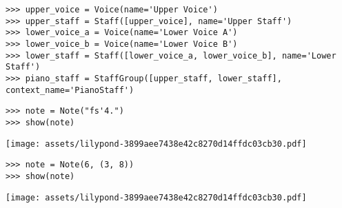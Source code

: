 \begin{abjadbookoutput}
\begin{singlespacing}
\vspace{-0.5\baselineskip}
\begin{lstlisting}
>>> upper_voice = Voice(name='Upper Voice')
>>> upper_staff = Staff([upper_voice], name='Upper Staff')
>>> lower_voice_a = Voice(name='Lower Voice A')
>>> lower_voice_b = Voice(name='Lower Voice B')
>>> lower_staff = Staff([lower_voice_a, lower_voice_b], name='Lower Staff')
>>> piano_staff = StaffGroup([upper_staff, lower_staff], context_name='PianoStaff')
\end{lstlisting}
\end{singlespacing}
\end{abjadbookoutput}

\begin{comment}
<abjad>
note = Note("fs'4.")
show(note)
</abjad>
\end{comment}

\begin{abjadbookoutput}
\begin{singlespacing}
\vspace{-0.5\baselineskip}
\begin{lstlisting}
>>> note = Note("fs'4.")
>>> show(note)
\end{lstlisting}
\noindent\texttt{[image: assets/lilypond-3899aee7438e42c8270d14ffdc03cb30.pdf]}
\end{singlespacing}
\end{abjadbookoutput}

\begin{comment}
<abjad>
note = Note(6, (3, 8))
show(note)
</abjad>
\end{comment}

\begin{abjadbookoutput}
\begin{singlespacing}
\vspace{-0.5\baselineskip}
\begin{lstlisting}
>>> note = Note(6, (3, 8))
>>> show(note)
\end{lstlisting}
\noindent\texttt{[image: assets/lilypond-3899aee7438e42c8270d14ffdc03cb30.pdf]}
\end{singlespacing}
\end{abjadbookoutput}

\begin{comment}
<abjad>
chord = Chord("<c'' ef'' g''>2")
show(chord)
</abjad>
\end{comment}

